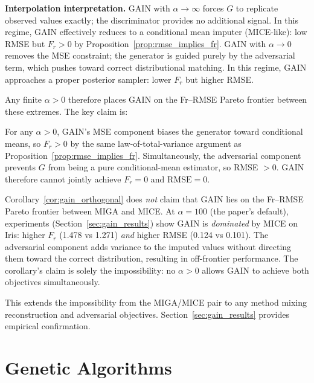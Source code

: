 \textbf{Interpolation interpretation.} GAIN with $\alpha \to \infty$ forces $G$ to replicate observed values exactly; the discriminator provides no additional signal. In this regime, GAIN effectively reduces to a conditional mean imputer (MICE-like): low RMSE but $F_r > 0$ by Proposition~\ref{prop:rmse_implies_fr}. GAIN with $\alpha \to 0$ removes the MSE constraint; the generator is guided purely by the adversarial term, which pushes toward correct distributional matching. In this regime, GAIN approaches a proper posterior sampler: lower $F_r$ but higher RMSE.

Any finite $\alpha > 0$ therefore places GAIN on the Fr--RMSE Pareto frontier between these extremes. The key claim is:

\begin{corollary}[GAIN cannot achieve $F_r = 0$ and $\mathrm{RMSE} = 0$ simultaneously]
\label{cor:gain_orthogonal}
For any $\alpha > 0$, GAIN's MSE component biases the generator toward conditional means, so $F_r > 0$ by the same law-of-total-variance argument as Proposition~\ref{prop:rmse_implies_fr}. Simultaneously, the adversarial component prevents $G$ from being a pure conditional-mean estimator, so RMSE $> 0$. GAIN therefore cannot jointly achieve $F_r = 0$ and $\mathrm{RMSE} = 0$.
\end{corollary}

\begin{remark}
Corollary~\ref{cor:gain_orthogonal} does \emph{not} claim that GAIN lies on the Fr--RMSE Pareto frontier between MIGA and MICE. At $\alpha = 100$ (the paper's default), experiments (Section~\ref{sec:gain_results}) show GAIN is \emph{dominated} by MICE on Iris: higher $F_r$ (1.478 vs 1.271) \emph{and} higher RMSE (0.124 vs 0.101). The adversarial component adds variance to the imputed values without directing them toward the correct distribution, resulting in off-frontier performance. The corollary's claim is solely the impossibility: no $\alpha > 0$ allows GAIN to achieve both objectives simultaneously.
\end{remark}

This extends the impossibility from the MIGA/MICE pair to any method mixing reconstruction and adversarial objectives. Section~\ref{sec:gain_results} provides empirical confirmation.


\section{Genetic Algorithms}

